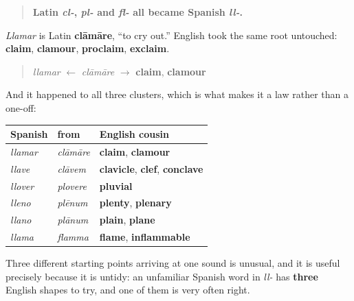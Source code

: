 \begin{grammarlens}[title={Grammar Lens: three clusters, one destination}]
\begin{quote}
\textbf{Latin \emph{cl-}, \emph{pl-} and \emph{fl-} all became Spanish \emph{ll-}.}
\end{quote}

\emph{Llamar} is Latin \textbf{clāmāre}, \textquotedblleft{}to cry out.\textquotedblright{} English took the same root untouched: \textbf{claim}, \textbf{clamour}, \textbf{proclaim}, \textbf{exclaim}.

\begin{quote}
\emph{llamar} $\leftarrow$ \emph{clāmāre} $\to$ \textbf{claim}, \textbf{clamour}
\end{quote}

And it happened to all three clusters, which is what makes it a law rather than a one-off:

\noindent
\begin{tabularx}{\linewidth}{@{}>{\raggedright\arraybackslash}X>{\raggedright\arraybackslash}X>{\raggedright\arraybackslash}X@{}}
\toprule
\textbf{Spanish} & \textbf{from} & \textbf{English cousin} \\
\midrule
\emph{llamar} & \emph{clāmāre} & \textbf{claim}, \textbf{clamour} \\
\emph{llave} & \emph{clāvem} & \textbf{clavicle}, \textbf{clef}, \textbf{conclave} \\
\emph{llover} & \emph{plovere} & \textbf{pluvial} \\
\emph{lleno} & \emph{plēnum} & \textbf{plenty}, \textbf{plenary} \\
\emph{llano} & \emph{plānum} & \textbf{plain}, \textbf{plane} \\
\emph{llama} & \emph{flamma} & \textbf{flame}, \textbf{inflammable} \\
\bottomrule
\end{tabularx}

Three different starting points arriving at one sound is unusual, and it is useful precisely because it is untidy: an unfamiliar Spanish word in \emph{ll-} has \textbf{three} English shapes to try, and one of them is very often right.
\end{grammarlens}

